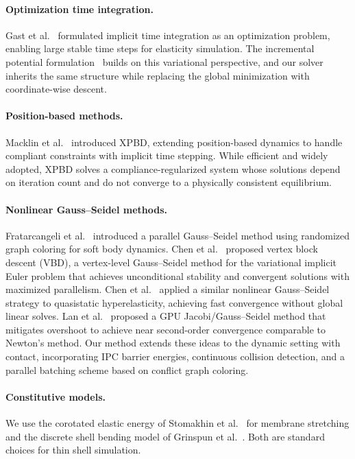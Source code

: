 \documentclass[acmtog,anonymous,review]{acmart}
\begin{document}
\paragraph{Optimization time integration.}
Gast et al.~\cite{gast2015optimization} formulated implicit time
integration as an optimization problem, enabling large stable time
steps for elasticity simulation. The incremental potential
formulation~\cite{li2020ipc} builds on this variational perspective,
and our solver inherits the same structure while replacing the global
minimization with coordinate-wise descent.

\paragraph{Position-based methods.}
Macklin et al.~\cite{macklin2016xpbd} introduced XPBD, extending
position-based dynamics to handle compliant constraints with implicit
time stepping. While efficient and widely adopted, XPBD solves a
compliance-regularized system whose solutions depend on iteration
count and do not converge to a physically consistent equilibrium.

\paragraph{Nonlinear Gauss--Seidel methods.}
Fratarcangeli et al.~\cite{fratarcangeli2016vivace} introduced a
parallel Gauss--Seidel method using randomized graph coloring for
soft body dynamics.
Chen et al.~\cite{chen2024vbd} proposed vertex block descent (VBD),
a vertex-level Gauss--Seidel method for the variational implicit
Euler problem that achieves unconditional stability and convergent
solutions with maximized parallelism.
Chen et al.~\cite{chen2024xpbd} applied a similar nonlinear
Gauss--Seidel strategy to quasistatic hyperelasticity, achieving
fast convergence without global linear solves.
Lan et al.~\cite{lan2025jgs2} proposed a GPU Jacobi/Gauss--Seidel
method that mitigates overshoot to achieve near second-order
convergence comparable to Newton's method. Our method extends these
ideas to the dynamic setting with contact, incorporating IPC barrier
energies, continuous collision detection, and a parallel batching
scheme based on conflict graph coloring.

\paragraph{Constitutive models.}
We use the corotated elastic energy of Stomakhin et
al.~\cite{stomakhin2012elasticity} for membrane stretching and the
discrete shell bending model of Grinspun et
al.~\cite{grinspun2003discrete}. Both are standard choices for thin
shell simulation.
\end{document}
